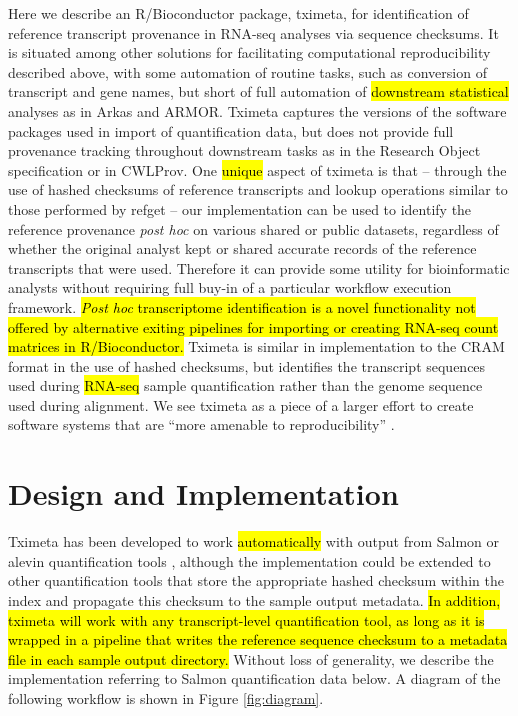 Here we describe an R/Bioconductor package, tximeta, for
identification of reference transcript provenance in RNA-seq analyses
via sequence checksums. It is situated among other solutions for
facilitating computational reproducibility described above, with some
automation of routine tasks, such as conversion of transcript and gene
names, but short of full automation of \hl{downstream statistical} analyses
as in Arkas and ARMOR. Tximeta captures the versions of the software
packages used in import of quantification data, but does not provide
full provenance tracking throughout downstream tasks as in the
Research Object specification or in CWLProv. One \hl{unique} aspect of
tximeta is that -- through the use of hashed checksums of reference
transcripts and lookup operations similar to those performed by refget
-- our implementation can be used to identify the reference provenance
\textit{post hoc} on various shared or public datasets, regardless of
whether the original analyst kept or shared accurate records of the
reference transcripts that were used. Therefore it can provide some
utility for bioinformatic analysts without requiring full buy-in of a
particular workflow execution framework.
\hl{\textit{Post hoc} transcriptome identification is a novel
functionality not offered by alternative exiting pipelines for
importing or creating RNA-seq count matrices in R/Bioconductor.}
Tximeta is similar in implementation to the CRAM format in the use of
hashed checksums, but identifies the transcript sequences used during
\hl{RNA-seq} sample quantification rather than the genome sequence
used during alignment. We see tximeta as a piece of a larger effort to
create software systems that are ``more amenable to reproducibility''
\cite{Peng2011}.

\section*{Design and Implementation}

Tximeta has been developed to work \hl{automatically} with output from
Salmon or alevin quantification tools \cite{salmon,alevin},
although the implementation could be extended to other quantification
tools that store the appropriate hashed checksum within the index and
propagate this checksum to the sample output metadata.
\hl{In addition, tximeta will work with any transcript-level
quantification tool, as long as it is wrapped in a pipeline that
writes the reference sequence checksum to a metadata file in each
sample output directory.} Without loss of generality, we
describe the implementation referring to Salmon quantification data
below. A diagram of the following workflow is shown in Figure
\ref{fig:diagram}. 

